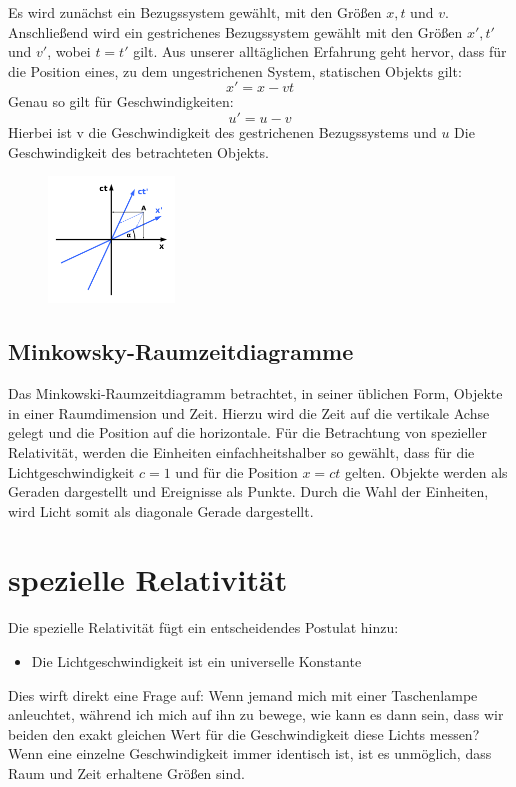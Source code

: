 \documentclass[12pt]{article}
\begin{document}
Es wird zunächst ein Bezugssystem gewählt, mit den Größen $x, t$ und $v$.
Anschließend wird ein gestrichenes Bezugssystem gewählt mit den Größen $x', t'$ und $v'$, wobei $t = t'$ gilt.
Aus unserer alltäglichen Erfahrung geht hervor, dass für die Position eines, zu dem ungestrichenen System, statischen Objekts gilt:
\begin{equation}
x' = x-vt
\end{equation}
Genau so gilt für Geschwindigkeiten:
\begin{equation}
\label{vnewton}
u' =u - v
\end{equation}
Hierbei ist v die Geschwindigkeit des gestrichenen Bezugssystems und $u$ Die Geschwindigkeit des betrachteten Objekts.

\begin{figure}
\centering
\includegraphics[width=0.3\textwidth]{Minkowski_diagram.png}
\end{figure}
\subsection{Minkowsky-Raumzeitdiagramme}
Das Minkowski-Raumzeitdiagramm betrachtet, in seiner üblichen Form, Objekte in einer Raumdimension und Zeit.
Hierzu wird die Zeit auf die vertikale Achse gelegt und die Position auf die horizontale.
Für die Betrachtung von spezieller Relativität, werden die Einheiten einfachheitshalber so gewählt, dass für die Lichtgeschwindigkeit $c = 1$ und für
die Position $x = ct$ gelten.
Objekte werden als Geraden dargestellt und Ereignisse als Punkte.
Durch die Wahl der Einheiten, wird Licht somit als diagonale Gerade dargestellt.
\newpage
\section{spezielle Relativität}
Die spezielle Relativität fügt ein entscheidendes Postulat hinzu:
\begin{itemize}
\item Die Lichtgeschwindigkeit ist ein universelle Konstante
\end{itemize}
Dies wirft direkt eine Frage auf:
Wenn jemand mich mit einer Taschenlampe anleuchtet, während ich mich auf ihn zu bewege, wie kann es dann sein, dass wir beiden den exakt gleichen Wert für die Geschwindigkeit diese Lichts messen?
Wenn eine einzelne Geschwindigkeit immer identisch ist, ist es unmöglich, dass Raum und Zeit erhaltene Größen sind.
\end{document}
